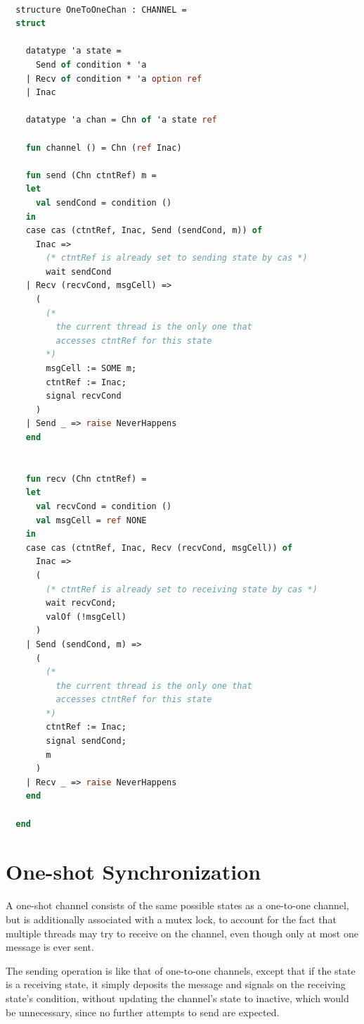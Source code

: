 \documentclass[letterpaper, 11pt]{report}
\begin{document}
\begin{lstlisting}[language=ML, mathescape]

  structure OneToOneChan : CHANNEL =
  struct

    datatype 'a state =
      Send of condition * 'a
    | Recv of condition * 'a option ref
    | Inac  

    datatype 'a chan = Chn of 'a state ref

    fun channel () = Chn (ref Inac)

    fun send (Chn ctntRef) m =
    let
      val sendCond = condition ()
    in
    case cas (ctntRef, Inac, Send (sendCond, m)) of
      Inac => 
        (* ctntRef is already set to sending state by cas *)
        wait sendCond
    | Recv (recvCond, msgCell) =>
      (
        (*
          the current thread is the only one that
          accesses ctntRef for this state
        *)
        msgCell := SOME m;
        ctntRef := Inac;
        signal recvCond
      )
    | Send _ => raise NeverHappens
    end


    fun recv (Chn ctntRef) =
    let
      val recvCond = condition ()
      val msgCell = ref NONE 
    in
    case cas (ctntRef, Inac, Recv (recvCond, msgCell)) of
      Inac =>
      (
        (* ctntRef is already set to receiving state by cas *)
        wait recvCond;
        valOf (!msgCell)
      )
    | Send (sendCond, m) =>
      (
        (*
          the current thread is the only one that
          accesses ctntRef for this state
        *)
        ctntRef := Inac;
        signal sendCond;
        m
      )
    | Recv _ => raise NeverHappens
    end 

  end
\end{lstlisting}

\section{One-shot Synchronization}

A one-shot channel consists of the same possible states as a one-to-one channel, but is
additionally associated with a mutex lock, to account for the fact that multiple threads may
try to receive on the channel, even though only at most one message is ever sent.

The sending operation is like that of one-to-one channels,
except that if the state is a receiving state, it simply deposits the message and signals
on the receiving state's condition,
without updating the channel's state to inactive, which would be unnecessary, since
no further attempts to send are expected.
\end{document}
